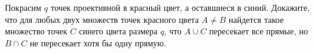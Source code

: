 Покрасим $q$ точек проективной в красный цвет, а оставшиеся в синий. Докажите, что для любых двух множеств точек красного
цвета $A \neq B$ найдется такое множество точек $C$ синего цвета размера $q$, что $A \cup C$ пересекает все прямые, но
$B \cap C$ не пересекает хотя бы одну прямую.
